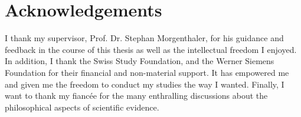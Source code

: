 \chapter*{Acknowledgements}
\label{cha:acknowledgements}
I thank my supervisor, Prof. Dr. Stephan Morgenthaler, for his guidance and feedback in the course of this thesis as well as the intellectual freedom I enjoyed. In addition, I thank the Swiss Study Foundation, and the Werner Siemens Foundation for their financial and non-material support. It has empowered me and given me the freedom to conduct my studies the way I wanted. Finally, I want to thank my fiancée for the many enthralling discussions about the philosophical aspects of scientific evidence. 